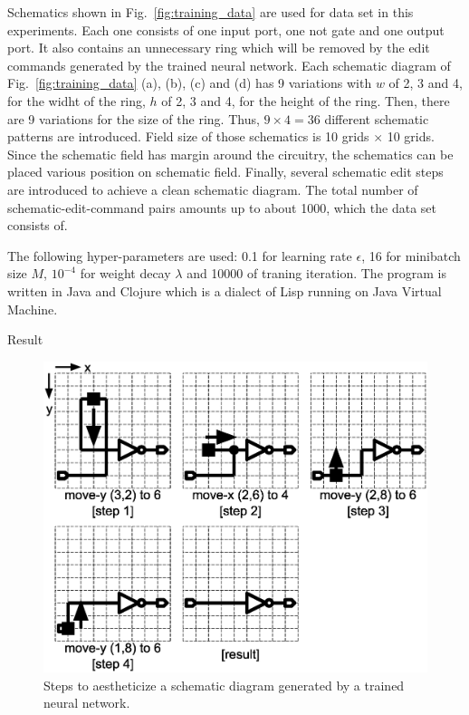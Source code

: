 \documentclass[twocolumn]{article}
\makeatletter
\def\section{\@startsection {section}{1}{\z@}{20pt plus 2pt minus 2pt}
{8pt plus 2pt minus 2pt}{\centering\normalsize\sc
\edef\@svsec{\thesection.\ }}}
\def\thesection{\Roman{section}}
\makeatother
\begin{document}
Schematics shown in Fig.\ \ref{fig:training_data} are used for data set
in this experiments.
Each one consists of one input port, one not gate and one output port.
It also contains an unnecessary ring which will be removed
by the edit commands generated by the trained neural network.
Each schematic diagram of Fig.\ \ref{fig:training_data} (a), (b), (c) and (d)
has 9 variations with
$w$ of 2, 3 and 4, for the widht of the ring,
$h$ of 2, 3 and 4, for the height of the ring.
Then, there are 9 variations for the size of the ring.
Thus, $9 \times 4 = 36$ different schematic patterns are introduced.
Field size of those schematics is 10 grids $\times$ 10 grids.
Since the schematic field has margin around the circuitry,
the schematics can be placed various position on schematic field.
Finally, several schematic edit steps are introduced
to achieve a clean schematic diagram.
The total number of schematic-edit-command pairs amounts up to about 1000,
which the data set consists of.

The following hyper-parameters are used:
0.1 for learning rate $\epsilon$,
16 for minibatch size $M$,
$10^{-4}$ for weight decay $\lambda$ and 10000 of traning iteration.
The program is written in Java and Clojure which is
a dialect of Lisp running on Java Virtual Machine.

\section{Result}

\begin{figure}[!tp]
 \begin{center}
  \begin{minipage}{\hsize}
   \includegraphics[width=\hsize]{fig/edit_steps_04.eps}
   \caption{Steps to aestheticize a schematic diagram
            generated by a trained neural network.}
   \label{fig:edit_steps}
  \end{minipage}
 \end{center}
\end{figure}
\end{document}
